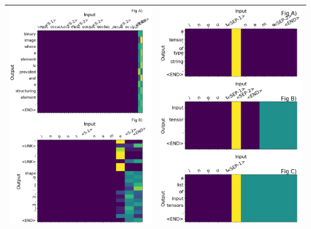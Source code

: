 \begin{table}
\begin{center}
\begin{tabular}{ | c || c |}
    \hline
    \hline
    \includegraphics[width=0.5\linewidth]{images/otherargs_example.png}
    &
    \includegraphics[width=0.5\linewidth]{images/different_translations_dupsXotherargs_3230minib.png} \\


    \hline

    \hline
\end{tabular}
\end{center}
\end{table}



